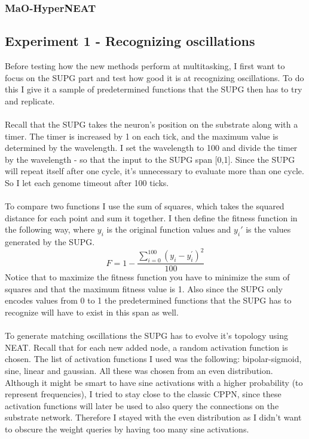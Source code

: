 \documentclass[11pt, a4paper]{article}
\begin{document}
\subsubsection{MaO-HyperNEAT}
\subsection{Experiment 1 - Recognizing oscillations}
Before testing how the new methods perform at  multitasking, I first want to focus on the SUPG part and test how good it is at recognizing oscillations. To do this I give it a sample of predetermined functions that the SUPG then has to try and replicate.
\\
\\
Recall that the SUPG takes the neuron's position on the substrate along with a timer. The timer is increased by 1 on each tick, and the maximum value is determined by the wavelength. I set the wavelength to 100 and divide the timer by the wavelength - so that the input to the SUPG span [0,1]. Since the SUPG will repeat itself after one cycle, it's unnecessary to evaluate more than one cycle. So I let each genome timeout after 100 ticks.
\\
\\
To compare two functions I use the sum of squares, which takes the squared distance for each point and sum it together. I then define the fitness function in the following way, where $ y_i $ is the original function values and $ y_i' $ is the values generated by the SUPG.
\begin{equation} F = 1 - \dfrac{\sum_{i=0}^{100}(y_i-y_i^{'})^2}{100} \end{equation}
Notice that to maximize the fitness function you have to minimize the sum of squares and that the maximum fitness value is 1. Also since the SUPG only encodes values from 0 to 1 the predetermined functions that the SUPG has to recognize will have to exist in this span as well.
\\
\\
To generate matching oscillations the SUPG has to evolve it's topology using NEAT. Recall that for each new added node, a random activation function is chosen. The list of activation functions I used was the following: bipolar-sigmoid, sine, linear and gaussian. All these was chosen from an even distribution. Although it might be smart to have sine activations with a higher probability (to represent frequencies), I tried to stay close to the classic CPPN, since these activation functions will later be used to also query the connections on the substrate network. Therefore I stayed with the even distribution as I didn't want to obscure the weight queries by having too many sine activations.
\end{document}

